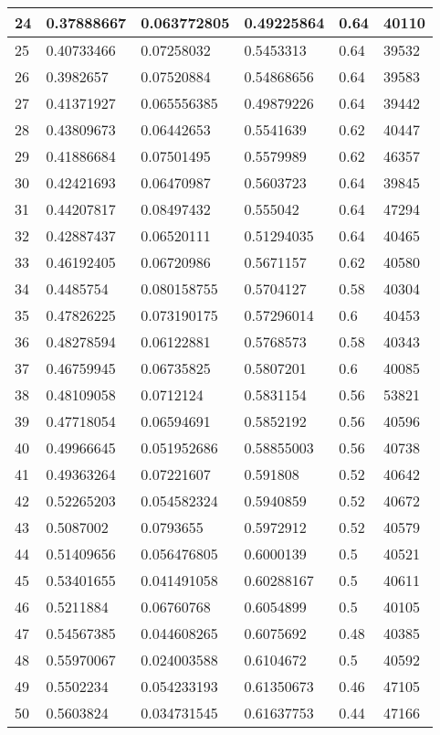 \begin{longtable}{|l|l|l|l|l|l|}
24 & 0.37888667 & 0.063772805 & 0.49225864 & 0.64 & 40110 \\ \hline 
25 & 0.40733466 & 0.07258032 & 0.5453313 & 0.64 & 39532 \\ \hline 
26 & 0.3982657 & 0.07520884 & 0.54868656 & 0.64 & 39583 \\ \hline 
27 & 0.41371927 & 0.065556385 & 0.49879226 & 0.64 & 39442 \\ \hline 
28 & 0.43809673 & 0.06442653 & 0.5541639 & 0.62 & 40447 \\ \hline 
29 & 0.41886684 & 0.07501495 & 0.5579989 & 0.62 & 46357 \\ \hline 
30 & 0.42421693 & 0.06470987 & 0.5603723 & 0.64 & 39845 \\ \hline 
31 & 0.44207817 & 0.08497432 & 0.555042 & 0.64 & 47294 \\ \hline 
32 & 0.42887437 & 0.06520111 & 0.51294035 & 0.64 & 40465 \\ \hline 
33 & 0.46192405 & 0.06720986 & 0.5671157 & 0.62 & 40580 \\ \hline 
34 & 0.4485754 & 0.080158755 & 0.5704127 & 0.58 & 40304 \\ \hline 
35 & 0.47826225 & 0.073190175 & 0.57296014 & 0.6 & 40453 \\ \hline 
36 & 0.48278594 & 0.06122881 & 0.5768573 & 0.58 & 40343 \\ \hline 
37 & 0.46759945 & 0.06735825 & 0.5807201 & 0.6 & 40085 \\ \hline 
38 & 0.48109058 & 0.0712124 & 0.5831154 & 0.56 & 53821 \\ \hline 
39 & 0.47718054 & 0.06594691 & 0.5852192 & 0.56 & 40596 \\ \hline 
40 & 0.49966645 & 0.051952686 & 0.58855003 & 0.56 & 40738 \\ \hline 
41 & 0.49363264 & 0.07221607 & 0.591808 & 0.52 & 40642 \\ \hline 
42 & 0.52265203 & 0.054582324 & 0.5940859 & 0.52 & 40672 \\ \hline 
43 & 0.5087002 & 0.0793655 & 0.5972912 & 0.52 & 40579 \\ \hline 
44 & 0.51409656 & 0.056476805 & 0.6000139 & 0.5 & 40521 \\ \hline 
45 & 0.53401655 & 0.041491058 & 0.60288167 & 0.5 & 40611 \\ \hline 
46 & 0.5211884 & 0.06760768 & 0.6054899 & 0.5 & 40105 \\ \hline 
47 & 0.54567385 & 0.044608265 & 0.6075692 & 0.48 & 40385 \\ \hline 
48 & 0.55970067 & 0.024003588 & 0.6104672 & 0.5 & 40592 \\ \hline 
49 & 0.5502234 & 0.054233193 & 0.61350673 & 0.46 & 47105 \\ \hline 
50 & 0.5603824 & 0.034731545 & 0.61637753 & 0.44 & 47166 \\ \hline 
\end{longtable}